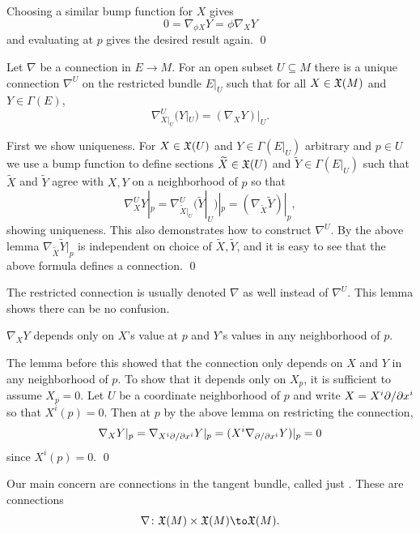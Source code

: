     Choosing a similar bump function for $X$ gives
    $$ 0 = \nabla_{\phi X}Y = \phi\nabla_XY $$
    and evaluating at $p$ gives the desired result again.
    \qed

\eproof

\blemm

    Let $\nabla$ be a connection in $E\to M$.
    For an open subset $U\subseteq M$ there is a unique connection $\nabla^U$ on the restricted bundle $E|_U$ such that
    for all $X\in{\frak X}(M)$ and $Y\in\Gamma(E)$,
    $$ \nabla_{X|_U}^U(Y|_U) = (\nabla_XY)|_U . $$

\elemm

\bproof

    First we show uniqueness.
    For $X\in{\frak X}(U)$ and $Y\in\Gamma(E|_U)$ arbitrary and $p\in U$ we use a bump function to define sections
    $\widetilde X\in{\frak X}(U)$ and $\tilde Y\in\Gamma(E|_U)$ such that $\tilde X$ and $\tilde Y$ agree with $X,Y$ on a neighborhood
    of $p$ so that
    $$ \nabla_X^UY|_p = \nabla_{\tilde X|_U}^U(\tilde Y|_U)|_p = (\nabla_{\tilde X}\tilde Y)|_p , $$
    showing uniqueness.
    This also demonstrates how to construct $\nabla^U$.
    By the above lemma $\nabla_{\tilde X}\tilde Y|_p$ is independent on choice of $\tilde X,\tilde Y$, and it is easy to see
    that the above formula defines a connection.
    \qed

\eproof

\bnote

    The restricted connection is usually denoted $\nabla$ as well instead of $\nabla^U$.
    This lemma shows there can be no confusion.

\enote

\bprop

    $\nabla_XY$ depends only on $X$'s value at $p$ and $Y$'s values in any neighborhood of $p$.

\eprop

\bproof

    The lemma before this showed that the connection only depends on $X$ and $Y$ in any neighborhood of $p$.
    To show that it depends only on $X_p$, it is sufficient to assume $X_p=0$.
    Let $U$ be a coordinate neighborhood of $p$ and write $X=X^i\partial /\partial x^i$ so that $X^i(p)=0$.
    Then at $p$ by the above lemma on restricting the connection,
    $$ \nabla_XY|_p = \nabla_{X^i\partial /\partial x^i}Y|_p = (X^i\nabla_{\partial /\partial x^i}Y)|_p = 0 $$
    since $X^i(p)=0$.
    \qed

\eproof

Our main concern are connections in the tangent bundle, called just .
These are connections
$$ \nabla\colon\X(M)\times\X(M)\to\X(M) . $$


